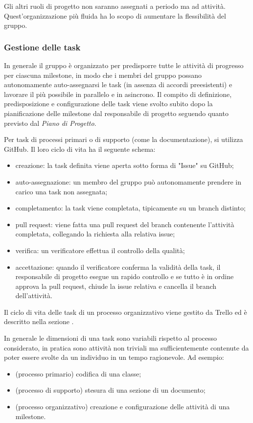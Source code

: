 Gli altri ruoli di progetto non saranno assegnati a periodo ma ad attività. Quest'organizzazione più fluida ha lo scopo di aumentare la flessibilità del gruppo.

\subsubsection{Gestione delle task}
In generale il gruppo è organizzato per predisporre tutte le attività di progresso per ciascuna milestone, in modo che i membri del gruppo possano autonomamente auto-assegnarsi le task (in assenza di accordi preesistenti) e lavorare il più possibile in parallelo e in asincrono. Il compito di definizione, predisposizione e configurazione delle task viene svolto subito dopo la pianificazione delle milestone dal responsabile di progetto seguendo quanto previsto dal \textit{Piano di Progetto}.

Per task di processi primari o di supporto (come la documentazione), si utilizza GitHub. Il loro ciclo di vita ha il seguente schema:
\begin{itemize}
  \item creazione: la task definita viene aperta sotto forma di "Issue" su GitHub;
  \item auto-assegnazione: un membro del gruppo può autonomamente prendere in carico una task non assegnata;
  \item completamento: la task viene completata, tipicamente su un branch distinto;
  \item pull request: viene fatta una pull request del branch contenente l'attività completata, collegando la richiesta alla relativa issue;
  \item verifica: un verificatore effettua il controllo della qualità;
  \item accettazione: quando il verificatore conferma la validità della task, il responsabile di progetto esegue un rapido controllo e se tutto è in ordine approva la pull request, chiude la issue relativa e cancella il branch dell'attività.
\end{itemize}

Il ciclo di vita delle task di un processo organizzativo viene gestito da Trello ed è descritto nella sezione .

In generale le dimensioni di una task sono variabili rispetto al processo considerato, in pratica sono attività non triviali ma sufficientemente contenute da poter essere svolte da un individuo in un tempo ragionevole. Ad esempio:
\begin{itemize}
  \item (processo primario) codifica di una classe;
  \item (processo di supporto) stesura di una sezione di un documento;
  \item (processo organizzativo) creazione e configurazione delle attività di una milestone.
\end{itemize}

